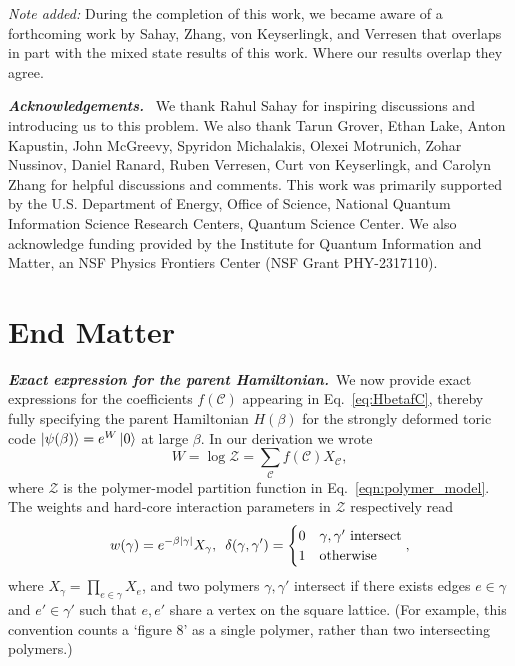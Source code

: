 \documentclass[aps,prl,twocolumn,floatfix,nofootinbib]{revtex4-2}
\theoremstyle{definition}
\begin{document}
\textit{Note added:} During the completion of this work, we became aware of a forthcoming work by Sahay, Zhang, von Keyserlingk, and Verresen that overlaps in part with the mixed state results of this work. Where our results overlap they agree.

\textbf{\textit{Acknowledgements.}}~
We thank Rahul Sahay for inspiring discussions and introducing us to this problem. We also thank Tarun Grover, Ethan Lake, Anton Kapustin, John McGreevy, Spyridon Michalakis, Olexei Motrunich, Zohar Nussinov, Daniel Ranard, Ruben Verresen, Curt von Keyserlingk, and Carolyn Zhang for helpful discussions and comments. This work was primarily supported by the U.S. Department of Energy, Office of Science, National Quantum Information Science Research Centers, Quantum Science Center. We also acknowledge funding provided by the Institute for Quantum Information and Matter, an NSF Physics Frontiers Center (NSF Grant PHY-2317110).


\makeatletter
\let\old@addcontentsline\addcontentsline
\renewcommand{\addcontentsline}[3]{}
\makeatother


\addcontentsline{toc}{section}{}

\clearpage
\newpage
\onecolumngrid
\section{End Matter}
\twocolumngrid

\textbf{\textit{Exact expression for the parent Hamiltonian.}}~We now provide exact expressions for the coefficients $f(\mathcal{C})$ appearing in Eq.~\eqref{eq:HbetafC}, thereby fully specifying the parent Hamiltonian $H(\beta)$ for the strongly deformed toric code $\ket{\psi(\beta)} = e^{W} \ket{0}$ at large $\beta$.  In our derivation we wrote 
\begin{equation}
     W = \log \mathcal{Z} = \sum_\mathcal{C} f(\mathcal{C})X_\mathcal{C} ,
     \label{eq:W_EM}
\end{equation} 
where $\mathcal{Z}$ is the polymer-model partition function in Eq.~\eqref{eqn:polymer_model}. The weights and hard-core interaction parameters in $\mathcal{Z}$ respectively read
\begin{equation}
    w(\gamma) = e^{-\beta \abs{\gamma}} X_\gamma, \,\,\, \delta(\gamma, \gamma') = \begin{cases}
        0 & \gamma, \gamma'\text{ intersect} \\
        1 & \text{otherwise}
    \end{cases},
\end{equation}
where $X_{\gamma} = \prod_{e \in \gamma} X_e$, and two polymers $\gamma, \gamma'$ intersect if there exists edges $e \in \gamma$ and $e' \in \gamma'$ such that $e, e'$ share a vertex on the square lattice.  (For example, this convention counts a `figure 8' as a single polymer, rather than two intersecting polymers.) 
\end{document}
